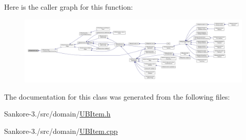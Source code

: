 Here is the caller graph for this function\-:
\nopagebreak
\begin{figure}[H]
\begin{center}
\leavevmode
\includegraphics[width=350pt]{d3/dbd/class_u_b_graphics_item_acab0781401cac08c9ad99b0cd0fa8480_icgraph}
\end{center}
\end{figure}




The documentation for this class was generated from the following files\-:\begin{DoxyCompactItemize}
\item 
Sankore-\/3./src/domain/\hyperlink{_u_b_item_8h}{U\-B\-Item.\-h}\item 
Sankore-\/3./src/domain/\hyperlink{_u_b_item_8cpp}{U\-B\-Item.\-cpp}\end{DoxyCompactItemize}
